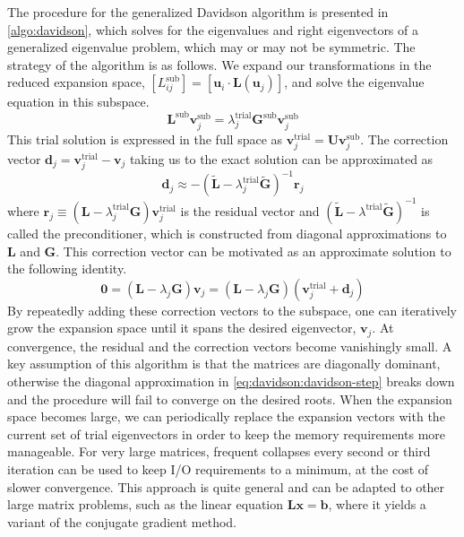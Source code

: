 The procedure for the generalized Davidson algorithm is presented in
\cref{algo:davidson}, which solves for the eigenvalues and right eigenvectors of
a generalized eigenvalue problem, which may or may not be symmetric.
The strategy of the algorithm is as follows.
We expand our transformations in the reduced expansion space,
\(
    [L_{ij}^\mathrm{sub}]
    =
    [\mathbf{u}_i\cdot \mathbf{L}(\mathbf{u}_j)]
\),
and solve the eigenvalue equation in this subspace.
\begin{equation}
    \mathbf{L}^\mathrm{sub}
    \mathbf{v}_j^\mathrm{sub}
    =
    \lambda_j^\mathrm{trial}
    \mathbf{G}^\mathrm{sub}
    \mathbf{v}_j^\mathrm{sub}
\end{equation}
This trial solution is expressed in the full space as
\(
    \mathbf{v}_j^\mathrm{trial}
    =
    \mathbf{U}\mathbf{v}_j^\mathrm{sub}
\).
The correction vector
\(
    \mathbf{d}_j
    =
    \mathbf{v}_j^\mathrm{trial}
    -
    \mathbf{v}_j
\)
taking us to the exact solution can be approximated as
\begin{equation}
    \label{eq:davidson:davidson-step}
    \mathbf{d}_j
    \approx
    -
    (
        \tilde{\mathbf{L}}
        -
        \lambda_j^\mathrm{trial}
        \tilde{\mathbf{G}}
    )^{-1}
    \mathbf{r}_j
\end{equation}
where
\(
    \mathbf{r}_j
    \equiv
    (\mathbf{L} - \lambda_j^\mathrm{trial}\mathbf{G})
    \mathbf{v}_j^\mathrm{trial}
\)
is the residual vector and
\(
    (
        \tilde{\mathbf{L}} - \lambda^\mathrm{trial}\tilde{\mathbf{G}}
    )^{-1}
\)
is called the preconditioner, which is constructed from diagonal
approximations to \(\mathbf{L}\) and \(\mathbf{G}\).
This correction vector can be motivated as an approximate solution to the
following identity.
\begin{equation}
    \mathbf{0}
    =
    (\mathbf{L} - \lambda_j\mathbf{G})
    \mathbf{v}_j
    =
    (\mathbf{L} - \lambda_j\mathbf{G})
    (
        \mathbf{v}_j^\mathrm{trial}
        +
        \mathbf{d}_j
    )
\end{equation}
By repeatedly adding these correction vectors to the subspace, one can
iteratively grow the expansion space until it spans the desired eigenvector,
\(\mathbf{v}_j\).
At convergence, the residual and the correction vectors become vanishingly
small.
A key assumption of this algorithm is that the matrices are diagonally
dominant, otherwise the diagonal approximation in
\cref{eq:davidson:davidson-step} breaks down and the procedure will
fail to converge on the desired roots.
When the expansion space becomes large, we can periodically replace the
expansion vectors with the current set of trial eigenvectors in order to
keep the memory requirements more manageable.
For very large matrices, frequent collapses every second or third iteration can be used to keep I/O requirements to a minimum, at the cost
of slower convergence.\cite{Leininger:2001p1574}
This approach is quite general and can be adapted to other large matrix
problems, such as the linear equation
\(\mathbf{L}\mathbf{x}=\mathbf{b}\), where it yields a variant of the
conjugate gradient method.

